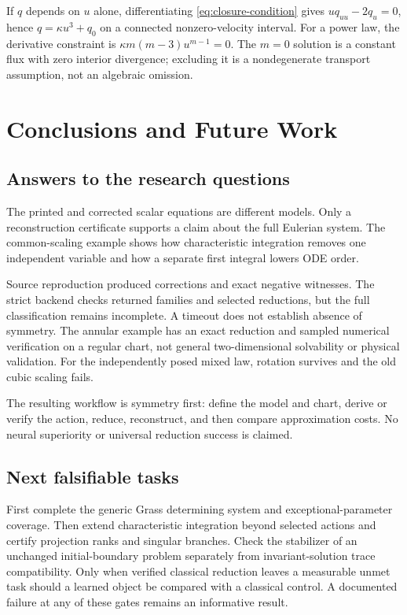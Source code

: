 \documentclass[11pt,a4paper,oneside]{report}
\numberwithin{equation}{chapter}
\begin{document}
If $q$ depends on $u$ alone, differentiating \eqref{eq:closure-condition} gives $uq_{uu}-2q_u=0$, hence $q=\kappa u^3+q_0$ on a connected nonzero-velocity interval. For a power law, the derivative constraint is $\kappa m(m-3)u^{m-1}=0$. The $m=0$ solution is a constant flux with zero interior divergence; excluding it is a nondegenerate transport assumption, not an algebraic omission.

\chapter{Conclusions and Future Work}
\section{Answers to the research questions}
The printed and corrected scalar equations are different models. Only a reconstruction certificate supports a claim about the full Eulerian system. The common-scaling example shows how characteristic integration removes one independent variable and how a separate first integral lowers ODE order.

Source reproduction produced corrections and exact negative witnesses. The strict backend checks returned families and selected reductions, but the full classification remains incomplete. A timeout does not establish absence of symmetry. The annular example has an exact reduction and sampled numerical verification on a regular chart, not general two-dimensional solvability or physical validation. For the independently posed mixed law, rotation survives and the old cubic scaling fails.

The resulting workflow is symmetry first: define the model and chart, derive or verify the action, reduce, reconstruct, and then compare approximation costs. No neural superiority or universal reduction success is claimed.
\section{Next falsifiable tasks}
First complete the generic Grass determining system and exceptional-parameter coverage. Then extend characteristic integration beyond selected actions and certify projection ranks and singular branches. Check the stabilizer of an unchanged initial-boundary problem separately from invariant-solution trace compatibility. Only when verified classical reduction leaves a measurable unmet task should a learned object be compared with a classical control. A documented failure at any of these gates remains an informative result.
\appendix
\end{document}
